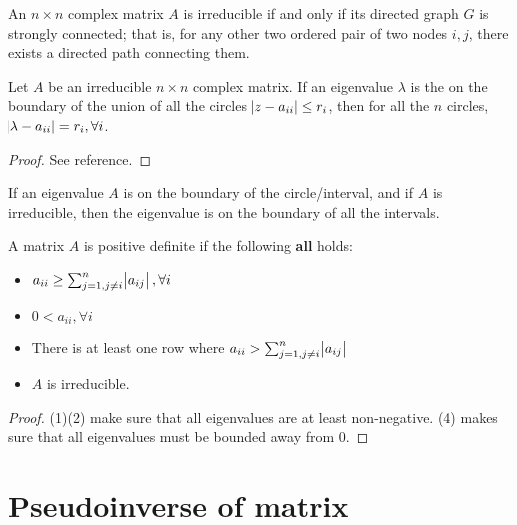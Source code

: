 \begin{refsection}
\begin{theorem}
An $n\times n$ complex matrix $A$ is irreducible if and only if its directed graph $G$ is strongly connected; that is, for any other two ordered pair of two nodes $i,j$, there exists a directed path connecting them. 
\end{theorem}


\begin{theorem}\cite[20]{varga2009matrix}\label{ch:linearalgebra:th:GerschgorinTausskytheorem}
Let $A$ be an irreducible $n\times n$ complex matrix. If an eigenvalue $\lambda$ is the on the boundary of the union of all the circles $\abs{z-a_{ii}} \leq r_i$, then for all the $n$ circles, $\abs{\lambda - a_{ii}} = r_i,\forall i$.
\end{theorem}
\begin{proof}
	See reference.
\end{proof}


\begin{remark}
If an eigenvalue $A$ is on the boundary of the circle/interval, and if $A$ is irreducible, then the eigenvalue is on the boundary of all the intervals.	
\end{remark}



\begin{corollary}\cite[197]{holmes2007introduction}
A matrix $A$ is positive definite if the following \textbf{all} holds:
\begin{itemize}
	\item $a_{ii} \geq \sum_{j=1,j\neq i}^n \abs{a_{ij}}, \forall i$
	\item $0 < a_{ii},\forall i$
	\item There is at least one row where $a_{ii} > \sum_{j=1,j\neq i}^n \abs{a_{ij}}$
	\item $A$ is irreducible.
\end{itemize}
\end{corollary}
\begin{proof}
	(1)(2) make sure that all eigenvalues are at least non-negative. (4) makes sure that all eigenvalues must be bounded away from 0.
\end{proof}





\section{Pseudoinverse of matrix}


\end{refsection}
